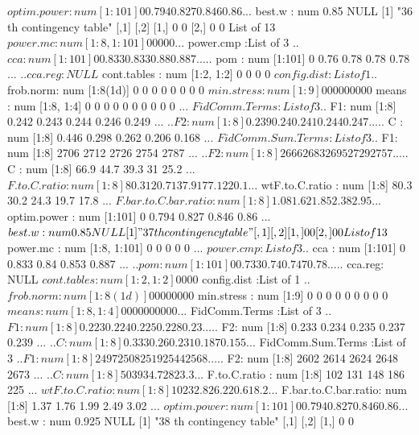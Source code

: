 \documentclass[11pt]{article} %
\begin{document}
\begin{Schunk}
\begin{Soutput}
 $ optim.power         : num [1:101] 0 0.794 0.827 0.846 0.86 ...
 $ best.w              : num 0.85
NULL
[1] "36 th contingency table"
     [,1] [,2]
[1,]    0    0
[2,]    0    0
List of 13
 $ power.mc            : num [1:8, 1:101] 0 0 0 0 0 ...
 $ power.cmp           :List of 3
  ..$ cca    : num [1:101] 0 0.833 0.833 0.88 0.887 ...
  ..$ pom    : num [1:101] 0 0.76 0.78 0.78 0.78 ...
  ..$ cca.reg: NULL
 $ cont.tables         : num [1:2, 1:2] 0 0 0 0
 $ config.dist         :List of 1
  ..$ frob.norm: num [1:8(1d)] 0 0 0 0 0 0 0 0
 $ min.stress          : num [1:9] 0 0 0 0 0 0 0 0 0
 $ means               : num [1:8, 1:4] 0 0 0 0 0 0 0 0 0 0 ...
 $ FidComm.Terms       :List of 3
  ..$ F1: num [1:8] 0.242 0.243 0.244 0.246 0.249 ...
  ..$ F2: num [1:8] 0.239 0.24 0.241 0.244 0.247 ...
  ..$ C : num [1:8] 0.446 0.298 0.262 0.206 0.168 ...
 $ FidComm.Sum.Terms   :List of 3
  ..$ F1: num [1:8] 2706 2712 2726 2754 2787 ...
  ..$ F2: num [1:8] 2666 2683 2695 2729 2757 ...
  ..$ C : num [1:8] 66.9 44.7 39.3 31 25.2 ...
 $ F.to.C.ratio        : num [1:8] 80.3 120.7 137.9 177.1 220.1 ...
 $ wtF.to.C.ratio      : num [1:8] 80.3 30.2 24.3 19.7 17.8 ...
 $ F.bar.to.C.bar.ratio: num [1:8] 1.08 1.62 1.85 2.38 2.95 ...
 $ optim.power         : num [1:101] 0 0.794 0.827 0.846 0.86 ...
 $ best.w              : num 0.85
NULL
[1] "37 th contingency table"
     [,1] [,2]
[1,]    0    0
[2,]    0    0
List of 13
 $ power.mc            : num [1:8, 1:101] 0 0 0 0 0 ...
 $ power.cmp           :List of 3
  ..$ cca    : num [1:101] 0 0.833 0.84 0.853 0.887 ...
  ..$ pom    : num [1:101] 0 0.733 0.74 0.747 0.78 ...
  ..$ cca.reg: NULL
 $ cont.tables         : num [1:2, 1:2] 0 0 0 0
 $ config.dist         :List of 1
  ..$ frob.norm: num [1:8(1d)] 0 0 0 0 0 0 0 0
 $ min.stress          : num [1:9] 0 0 0 0 0 0 0 0 0
 $ means               : num [1:8, 1:4] 0 0 0 0 0 0 0 0 0 0 ...
 $ FidComm.Terms       :List of 3
  ..$ F1: num [1:8] 0.223 0.224 0.225 0.228 0.23 ...
  ..$ F2: num [1:8] 0.233 0.234 0.235 0.237 0.239 ...
  ..$ C : num [1:8] 0.333 0.26 0.231 0.187 0.155 ...
 $ FidComm.Sum.Terms   :List of 3
  ..$ F1: num [1:8] 2497 2508 2519 2544 2568 ...
  ..$ F2: num [1:8] 2602 2614 2624 2648 2673 ...
  ..$ C : num [1:8] 50 39 34.7 28 23.3 ...
 $ F.to.C.ratio        : num [1:8] 102 131 148 186 225 ...
 $ wtF.to.C.ratio      : num [1:8] 102 32.8 26.2 20.6 18.2 ...
 $ F.bar.to.C.bar.ratio: num [1:8] 1.37 1.76 1.99 2.49 3.02 ...
 $ optim.power         : num [1:101] 0 0.794 0.827 0.846 0.86 ...
 $ best.w              : num 0.925
NULL
[1] "38 th contingency table"
     [,1] [,2]
[1,]    0    0

\end{Soutput}
\end{Schunk}
\end{document}
